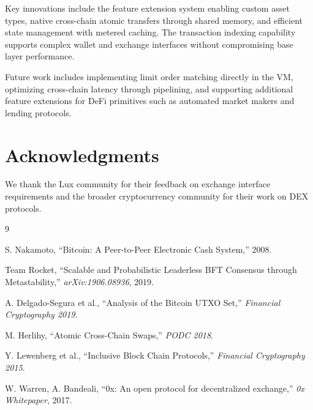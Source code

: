 \documentclass[11pt,a4paper]{article}
\begin{document}
Key innovations include the feature extension system enabling custom asset types, native cross-chain atomic transfers through shared memory, and efficient state management with metered caching. The transaction indexing capability supports complex wallet and exchange interfaces without compromising base layer performance.

Future work includes implementing limit order matching directly in the VM, optimizing cross-chain latency through pipelining, and supporting additional feature extensions for DeFi primitives such as automated market makers and lending protocols.

\section*{Acknowledgments}

We thank the Lux community for their feedback on exchange interface requirements and the broader cryptocurrency community for their work on DEX protocols.


\begin{thebibliography}{9}

S. Nakamoto, ``Bitcoin: A Peer-to-Peer Electronic Cash System,'' 2008.

Team Rocket, ``Scalable and Probabilistic Leaderless BFT Consensus through Metastability,'' \textit{arXiv:1906.08936}, 2019.

A. Delgado-Segura et al., ``Analysis of the Bitcoin UTXO Set,'' \textit{Financial Cryptography 2019}.

M. Herlihy, ``Atomic Cross-Chain Swaps,'' \textit{PODC 2018}.

Y. Lewenberg et al., ``Inclusive Block Chain Protocols,'' \textit{Financial Cryptography 2015}.

W. Warren, A. Bandeali, ``0x: An open protocol for decentralized exchange,'' \textit{0x Whitepaper}, 2017.

\end{thebibliography}
\end{document}
